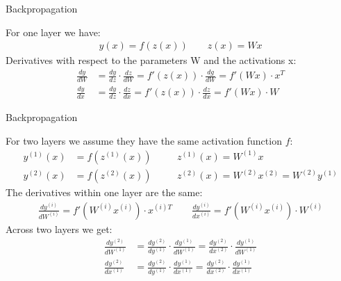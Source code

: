 \documentclass[aspectratio=169]{beamer}
\begin{document}

\begin{frame}{Backpropagation}

For one layer we have:
\begin{align}
y(x) = f(z(x)) \qquad z(x) = W x 
\end{align}
Derivatives with respect to the parameters W and the activations x:
\begin{align}
\frac{d y} { d W} &= \frac{ d y} {d z} \cdot \frac{d z} {d W} = f'(z(x)) \cdot \frac{d g} { d W} = f'(Wx) \cdot x^T \\
\frac{d y} { d x} &= \frac{ d y} {d z} \cdot \frac{d z} {d x} = f'(z(x)) \cdot \frac{d z} { d x} = f'(Wx) \cdot W
\end{align}

\end{frame}


\begin{frame}{Backpropagation}

For two layers we assume they have the same activation function $f$:
\begin{align}
y^{(1)}(x) &= f(z^{(1)}(x)) \quad && z^{(1)}(x) = W^{(1)} x \\
y^{(2)}(x) &= f(z^{(2)}(x)) \quad && z^{(2)}(x) = W^{(2)} x^{(2)} = W^{(2)} y^{(1)}
\end{align}
The derivatives within one layer are the same:
\begin{align}
\frac{d y^{(i)}} { d W^{(i)}} = f' (W^{(i)} x^{(i)}) \cdot x^{(i) T} \qquad
\frac{d y^{(i)}} { d x^{(i)}} = f'(W^{(i)} x^{(i)}) \cdot W^{(i)}
\end{align}
Across two layers we get:
\begin{align}
\frac{d y^{(2)}} { d W^{(1)}} &= \frac{ d y^{(2)}} {d y^{(1)}} \cdot \frac{d y^{(1)}} {d W^{(1)}} = 
\frac{ d y^{(2)}} {d x^{(2)}} \cdot \frac{d y^{(1)}} {d W^{(1)}}  \\
\frac{d y^{(2)}} { d x^{(1)}} &= \frac{ d y^{(2)}} {d y^{(1)}} \cdot \frac{d y^{(1)}} {d x^{(1)}} = 
\frac{ d y^{(2)}} {d x^{(2)}} \cdot \frac{d y^{(1)}} {d x^{(1)}}  
\end{align}
 
\end{frame}

\end{document}
